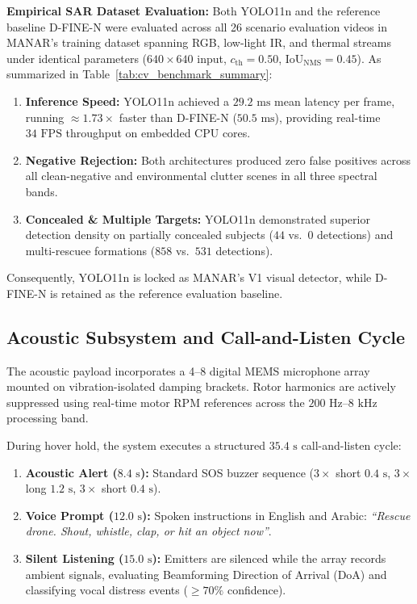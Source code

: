 \textbf{Empirical SAR Dataset Evaluation:} Both YOLO11n and the reference baseline D-FINE-N were evaluated across all 26 scenario evaluation videos in MANAR's training dataset spanning RGB, low-light IR, and thermal streams under identical parameters ($640 \times 640$ input, $c_{\mathrm{th}} = 0.50$, $\text{IoU}_{\mathrm{NMS}} = 0.45$). As summarized in Table~\ref{tab:cv_benchmark_summary}:
\begin{enumerate}
    \item \textbf{Inference Speed:} YOLO11n achieved a $29.2\text{ ms}$ mean latency per frame, running $\approx 1.73\times$ faster than D-FINE-N ($50.5\text{ ms}$), providing real-time $34\text{ FPS}$ throughput on embedded CPU cores.
    \item \textbf{Negative Rejection:} Both architectures produced zero false positives across all clean-negative and environmental clutter scenes in all three spectral bands.
    \item \textbf{Concealed \& Multiple Targets:} YOLO11n demonstrated superior detection density on partially concealed subjects ($44$ vs.\ $0$ detections) and multi-rescuee formations ($858$ vs.\ $531$ detections).
\end{enumerate}
Consequently, YOLO11n is locked as MANAR's V1 visual detector, while D-FINE-N is retained as the reference evaluation baseline.

\subsection{Acoustic Subsystem and Call-and-Listen Cycle}
The acoustic payload incorporates a 4--8 digital MEMS microphone array mounted on vibration-isolated damping brackets. Rotor harmonics are actively suppressed using real-time motor RPM references across the $200\text{ Hz}\text{--}8\text{ kHz}$ processing band.

During hover hold, the system executes a structured $35.4\text{ s}$ call-and-listen cycle:
\begin{enumerate}
    \item \textbf{Acoustic Alert ($8.4\text{ s}$):} Standard SOS buzzer sequence ($3\times$ short $0.4\text{ s}$, $3\times$ long $1.2\text{ s}$, $3\times$ short $0.4\text{ s}$).
    \item \textbf{Voice Prompt ($12.0\text{ s}$):} Spoken instructions in English and Arabic: \emph{``Rescue drone. Shout, whistle, clap, or hit an object now''}.
    \item \textbf{Silent Listening ($15.0\text{ s}$):} Emitters are silenced while the array records ambient signals, evaluating Beamforming Direction of Arrival (DoA) and classifying vocal distress events ($\ge 70\%$ confidence).
\end{enumerate}

